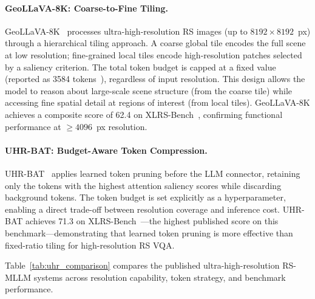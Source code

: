 \paragraph{GeoLLaVA-8K: Coarse-to-Fine Tiling.}
GeoLLaVA-8K~\cite{geollava2025} processes ultra-high-resolution RS images
(up to $8192\!\times\!8192$~px) through a hierarchical tiling approach.
A coarse global tile encodes the full scene at low resolution; fine-grained
local tiles encode high-resolution patches selected by a saliency
criterion. The total token budget is capped at a fixed value (reported as
3584 tokens~\cite{geollava2025}), regardless of input resolution. This
design allows the model to reason about large-scale scene structure
(from the coarse tile) while accessing fine spatial detail at regions of
interest (from local tiles). GeoLLaVA-8K achieves a composite score of
62.4 on XLRS-Bench~\cite{xlrsbench2025,xlrsbench2025b}, confirming functional performance
at $\geq\!4096$~px resolution.

\paragraph{UHR-BAT: Budget-Aware Token Compression.}
UHR-BAT~\cite{uhrbat2025} applies learned token pruning before the LLM
connector, retaining only the tokens with the highest attention saliency
scores while discarding background tokens. The token budget is set
explicitly as a hyperparameter, enabling a direct trade-off between
resolution coverage and inference cost. UHR-BAT achieves 71.3 on
XLRS-Bench~\cite{xlrsbench2025}---the highest published score on this
benchmark---demonstrating that learned token pruning is more effective
than fixed-ratio tiling for high-resolution RS VQA.

Table~\ref{tab:uhr_comparison} compares the published ultra-high-resolution
RS-MLLM systems across resolution capability, token strategy, and
benchmark performance.

